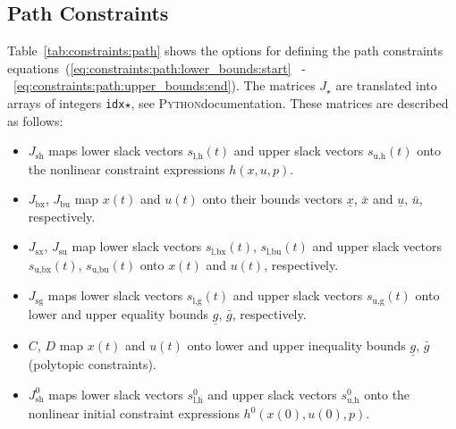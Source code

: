 \documentclass[english]{article}
\newcommand{\python}{\textsc{Python}}
\newcommand{\ind}[1]{_{\textrm{#1}}}
\newcommand{\initial}{^{\textrm{0}}}
\begin{document}
\subsection{Path Constraints}\label{sec:constraints:path}
%
Table~\ref{tab:constraints:path} shows the options for defining the path constraints equations~(\ref{eq:constraints:path:lower_bounds:start} ~-~\ref{eq:constraints:path:upper_bounds:end}).
The matrices $ J_{\star} $ are translated into arrays of integers \texttt{idx}$\star$, see \python documentation.
These matrices are described as follows:
\begin{itemize}
    \item $J\ind{sh}$ maps lower slack vectors $s\ind{l,h}(t)$ and upper slack vectors $s\ind{u,h}(t)$ onto the nonlinear constraint expressions $h(x,u,p)$.
    \item $J\ind{bx}$, $J\ind{bu}$ map $x(t)$ and $u(t)$ onto their bounds vectors $\underline{x}$, $\bar{x}$ and $\underline{u}$, $\bar{u}$, respectively.
    \item $J\ind{sx}$, $J\ind{su}$ map lower slack vectors $s\ind{l,bx}(t)$, $s\ind{l,bu}(t)$ and upper slack vectors $s\ind{u,bx}(t)$, $s\ind{u,bu}(t)$ onto $x(t)$ and $u(t)$, respectively.
    \item $J\ind{sg}$ maps lower slack vectors $s\ind{l,g}(t)$ and upper slack vectors $s\ind{u,g}(t)$ onto lower and upper equality bounds $\underline{g}$, $\bar{g}$, respectively.
    \item $C$, $D$ map $x(t)$ and $u(t)$ onto lower and upper inequality bounds $\underline{g}$, $\bar{g}$ (polytopic constraints).
    \item $J\ind{sh}\initial$ maps lower slack vectors $s\ind{l,h}\initial$ and upper slack vectors $s\ind{u,h}\initial$ onto the nonlinear initial constraint expressions $h\initial(x(0),u(0),p)$.
\end{itemize}
%
\end{document}
